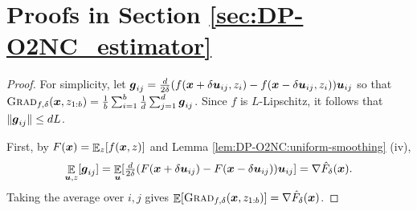 \section{Proofs in Section \ref{sec:DP-O2NC_estimator}}
\label{app:DP-O2NC:diff-estimator}


\begin{proof}
For simplicity, let ${\boldsymbol{g}}_{ij} = \frac{d}{2\delta}(f({\boldsymbol{x}}+\delta{\boldsymbol{u}}_{ij},z_i)-f({\boldsymbol{x}}-\delta{\boldsymbol{u}}_{ij},z_i)){\boldsymbol{u}}_{ij}$ so that \\
${\normalfont\textsc{Grad}}_{f,\delta}({\boldsymbol{x}},z_{1:b}) = \frac{1}{b}\sum_{i=1}^b\frac{1}{d}\sum_{j=1}^d {\boldsymbol{g}}_{ij}$. Since $f$ is $L$-Lipschitz, it follows that $\|{\boldsymbol{g}}_{ij}\| \le dL$.

First, by $F({\boldsymbol{x}})=\mathop{\mathbb{E}}_z[f({\boldsymbol{x}},z)]$ and Lemma \ref{lem:DP-O2NC:uniform-smoothing} (iv),
\begin{align*}
    \mathop{\mathbb{E}}_{{\boldsymbol{u}},z}[ {\boldsymbol{g}}_{ij} ] 
    = \mathop{\mathbb{E}}_{{\boldsymbol{u}}}[ \tfrac{d}{2\delta}(F({\boldsymbol{x}}+\delta{\boldsymbol{u}}_{ij})-F({\boldsymbol{x}}-\delta{\boldsymbol{u}}_{ij})){\boldsymbol{u}}_{ij} ] 
    = \nabla\hat F_\delta({\boldsymbol{x}}).
\end{align*}
Taking the average over $i,j$ gives $\mathop{\mathbb{E}}[{\normalfont\textsc{Grad}}_{f,\delta}({\boldsymbol{x}},z_{1:b})] = \nabla\hat F_\delta({\boldsymbol{x}})$.


\end{proof}

